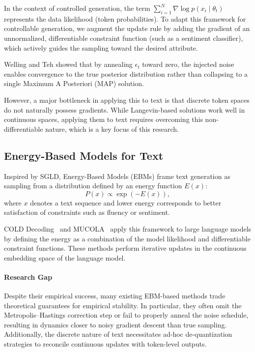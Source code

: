 \documentclass[11pt]{article}
\begin{document}
In the context of controlled generation, the term 
\(\sum_{i=1}^{N} \nabla \log p(x_i \mid \theta_t)\)
represents the data likelihood (token probabilities). To adapt this framework for controllable generation, we augment the update rule by adding the gradient of an unnormalized, differentiable constraint function (such as a sentiment classifier), which actively guides the sampling toward the desired attribute.
 
Welling and Teh showed that by annealing $\epsilon_t$ toward zero, the injected noise enables convergence to the true posterior distribution rather than collapsing to a single Maximum A Posteriori (MAP) solution. 

However, a major bottleneck in applying this to text is that discrete token spaces do not naturally possess gradients. While Langevin-based solutions work well in continuous spaces, applying them to text requires overcoming this non-differentiable nature, which is a key focus of this research.

\subsection{Energy-Based Models for Text}

Inspired by SGLD, Energy-Based Models (EBMs) frame text generation as sampling from a distribution defined by an energy function $E(x)$:
\begin{equation}
P(x) \propto \exp(-E(x)),
\end{equation}
where $x$ denotes a text sequence and lower energy corresponds to better satisfaction of constraints such as fluency or sentiment.

COLD Decoding~\cite{10.5555/3600270.3600963} and MUCOLA~\cite{kumar2022gradientbasedconstrainedsamplinglanguage} apply this framework to large language models by defining the energy as a combination of the model likelihood and differentiable constraint functions. These methods perform iterative updates in the continuous embedding space of the language model.

\paragraph{Research Gap}
Despite their empirical success, many existing EBM-based methods trade theoretical guarantees for empirical stability. In particular, they often omit the Metropolis--Hastings correction step or fail to properly anneal the noise schedule, resulting in dynamics closer to noisy gradient descent than true sampling. Additionally, the discrete nature of text necessitates ad-hoc de-quantization strategies to reconcile continuous updates with token-level outputs.
\end{document}

